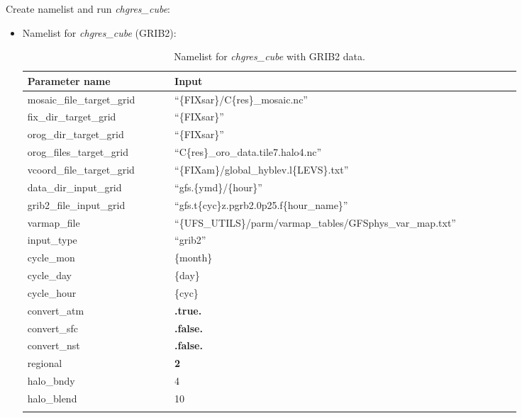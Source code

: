\documentclass[11pt,fleqn]{report}              %
\begin{document}
Create namelist and run {\it chgres\_cube}:

\begin{itemize}

\item Namelist for {\it chgres\_cube} (GRIB2):
{
\fontsize{9}{11}\selectfont
\begin{longtable}{ p{0.25\linewidth} | p{0.59\linewidth} }
\hline
\hline
 Parameter name & Input \\
\hline
 mosaic\_file\_target\_grid  & ``\{FIXsar\}/C\{res\}\_mosaic.nc''  \\
 fix\_dir\_target\_grid & ``\{FIXsar\}'' \\
 orog\_dir\_target\_grid & ``\{FIXsar\}'' \\
 orog\_files\_target\_grid & ``C\{res\}\_oro\_data.tile7.halo4.nc'' \\
 vcoord\_file\_target\_grid & ``\{FIXam\}/global\_hyblev.l\{LEVS\}.txt'' \\
 data\_dir\_input\_grid & ``gfs.\{ymd\}/\{hour\}''\\
 grib2\_file\_input\_grid & ``gfs.t\{cyc\}z.pgrb2.0p25.f\{hour\_name\}'' \\
 varmap\_file & ``\{UFS\_UTILS\}/parm/varmap\_tables/GFSphys\_var\_map.txt'' \\
 input\_type & ``grib2'' \\
 cycle\_mon & \{month\} \\
 cycle\_day &\{day\}  \\
 cycle\_hour & \{cyc\} \\
 convert\_atm & {\bf .true.} \\
 convert\_sfc & {\bf .false.} \\
 convert\_nst & {\bf .false.} \\
 regional & {\bf 2} \\
 halo\_bndy & 4 \\
 halo\_blend & 10 \\
\hline
\caption{Namelist for {\it chgres\_cube} with GRIB2 data.}
\label{table:namelist_bc_chgres_grib2}
\end{longtable}
}



\end{itemize}
\end{document}
